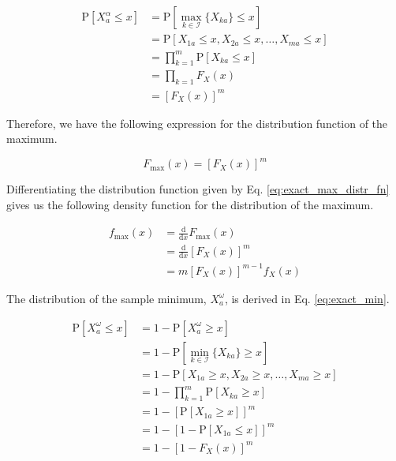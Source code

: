 \documentclass[10pt,letterpaper]{article}\usepackage[]{graphicx}\usepackage[]{color}
\begin{document}
\begin{equation}\label{eq:exact_max}
\begin{aligned}
\text{P}[X^\alpha_a \leq x] &= \text{P}\left[\max_{k \in \mathcal{I}}\{X_{ka}\} \leq x\right] \\
&= \text{P}[X_{1a} \leq x, X_{2a} \leq x, \dots, X_{ma} \leq x] \\
&= \prod_{k = 1}^{m} \text{P}[X_{ka} \leq x] \\
&= \prod_{k=1} F_X(x) \\
&= [F_X(x)]^m
\end{aligned}
\end{equation}

Therefore, we have the following expression for the distribution function of the maximum.

\begin{equation}\label{eq:exact_max_distr_fn}
F_\text{max}(x) = [F_X(x)]^m
\end{equation}

Differentiating the distribution function given by Eq. \ref{eq:exact_max_distr_fn} gives us the following density function for the distribution of the maximum.

\begin{equation}\label{eq:exact_max_dens_fn}
\begin{aligned}
f_\text{max}(x) &= \frac{\text{d}}{\text{d}x} F_\text{max}(x) \\
&= \frac{\text{d}}{\text{d}x} [F_X(x)]^m \\
&= m [F_X(x)]^{m-1} f_X(x)
\end{aligned}
\end{equation}

The distribution of the sample minimum, $X^\omega_a$, is derived in Eq. \ref{eq:exact_min}.

\begin{equation}\label{eq:exact_min}
\begin{aligned}
\text{P}[X^\omega_a \leq x] &= 1 - \text{P}[X^\omega_a \geq x] \\
&= 1 - \text{P}\left[\min_{k \in \mathcal{I}}\{X_{ka}\} \geq x\right] \\
&= 1 - \text{P}[X_{1a} \geq x, X_{2a} \geq x, \dots, X_{ma} \geq x] \\
&= 1 - \prod_{k=1}^{m}\text{P}[X_{ka} \geq x] \\
&= 1 - \left[\text{P}[X_{1a} \geq x]\right]^m \\
&= 1 - \left[1 - \text{P}[X_{1a} \leq x]\right]^m \\
&= 1 - \left[1 - F_X(x)\right]^m
\end{aligned}
\end{equation}
\end{document}
